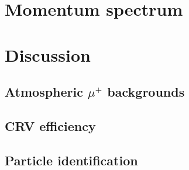 

\section{Momentum spectrum}

\section{Discussion}

\subsection{Atmospheric $\mu^+$ backgrounds}

\subsection{CRV efficiency}

\subsection{Particle identification}
